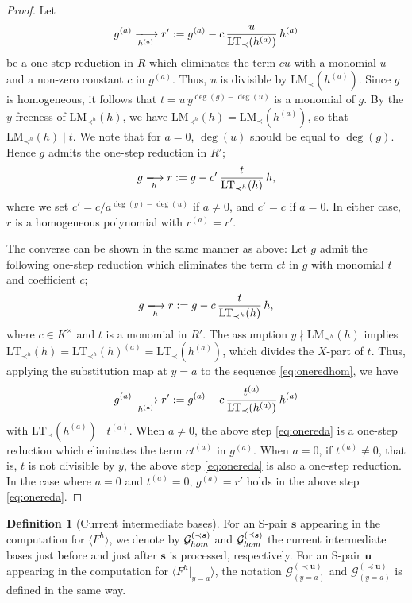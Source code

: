\documentclass{article}
\theoremstyle{definition}
\newtheorem{definition}[theorem]{Definition}
\theoremstyle{plain}
\theoremstyle{plain}
\theoremstyle{plain}
\theoremstyle{plain}
\numberwithin{equation}{subsection}
\begin{document}
\begin{proof}
Let
\[
g^{(a)} %
\xlongrightarrow[h^{(a)}]{} r'
:=
g^{(a)}-c\,\frac{u}{\mathrm{LT}_{\prec}(h^{(a)})}\,h^{(a)}
\]
be a one-step reduction in $R$ which eliminates the term $cu$ with a monomial $u$ and a non-zero constant $c$ in $g^{(a)}$. %
Thus, $u$ is divisible by $\mathrm{LM}_{\prec}(h^{(a)})$. 
Since $g$ is homogeneous, it follows that $t=u\,y^{\deg(g)-\deg(u)}$ is a monomial of $g$.
By the $y$-freeness of $\mathrm{LM}_{\prec^h}(h)$, we have $\mathrm{LM}_{\prec^h}(h)=\mathrm{LM}_{\prec}(h^{(a)})$, so that $\mathrm{LM}_{\prec^h}(h)\mid t$.
We note that for $a=0$, $\deg(u)$ should be equal to $\deg(g)$.
Hence $g$ admits the one-step reduction in $R'$;
\[
g \xlongrightarrow[h]{} r:=g-c'\,\frac{t}{\mathrm{LT}_{\prec^h}(h)}\,h,
\]
where we set $c'=c/ a^{\deg(g)-\deg(u)}$ if $a\neq 0$, and $c'=c$ if $a=0$.
In either case, $r$ is a homogeneous polynomial with $r^{(a)}=r'$.

The converse can be shown in the same manner as above: 
Let $g$ admit the following one-step reduction which eliminates the term $ct$ in $g$ with monomial $t$ and coefficient $c$;
\begin{equation}\label{eq:oneredhom}
g \xlongrightarrow[h]{} r:=g-c\,\frac{t}{\mathrm{LT}_{\prec^h}(h)}\,h,
\end{equation}
where $c\in K^\times$ and $t$ is a monomial in $R'$. 
The assumption $y\nmid \mathrm{LM}_{\prec^h}(h)$ implies $\mathrm{LT}_{\prec^h}(h) =\mathrm{LT}_{\prec^h}(h)^{(a)} = \mathrm{LT}_{\prec}(h^{(a)})$, which divides the $X$-part of $t$.
Thus, applying the substitution map at $y=a$ to the sequence \eqref{eq:oneredhom}, we have 
\begin{equation}\label{eq:onereda}
g^{(a)} \xlongrightarrow[h^{(a)}]{} r'
:=g^{(a)}-c\,\frac{t^{(a)}}{\mathrm{LT}_{\prec}{(h^{(a)})}}\,h^{(a)}
\end{equation}
with $\mathrm{LT}_{\prec}(h^{(a)})\mid t^{(a)}$.
When $a\not=0$, the above step \eqref{eq:onereda} is a one-step reduction which eliminates the term $ct^{(a)}$ in $g^{(a)}$. 
When $a=0$, if $t^{(a)}\not=0$, that is, $t$ is not divisible by $y$, the above step \eqref{eq:onereda} is also a one-step reduction. 
In the case where $a=0$ and $t^{(a)}=0$, $g^{(a)}=r'$ holds in the above step \eqref{eq:onereda}.
\end{proof}

\begin{definition}[Current intermediate bases]
For an S-pair $\bm{s}$ appearing in the computation for $\langle F^h\rangle$, we denote by $\mathcal{G}_{\rm hom}^{(\prec \bm{s})}$ and $\mathcal{G}_{\rm hom}^{(\preceq \bm{s})}$ the current intermediate bases just before and just after $\bm{s}$ is processed, respectively.
For an S-pair $\bm{u}$ appearing in the computation for $\langle F^h|_{y=a}\rangle$, the notation $\mathcal{G}_{(y=a)}^{(\prec \bm{u})}$ and $\mathcal{G}_{(y=a)}^{(\preceq \bm{u})}$ is defined in the same way.
\end{definition}
\end{document}
